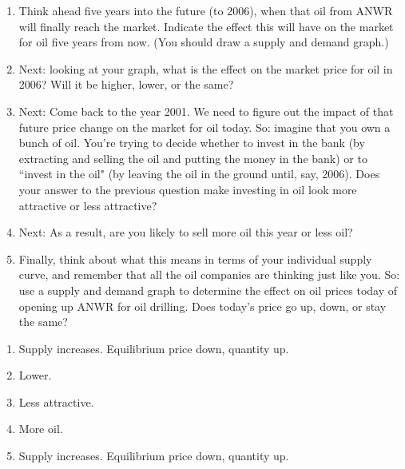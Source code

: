 \documentclass{article}
\begin{document}
\begin{enumerate}
\begin{EXAM}
    \begin{enumerate}
    \item Think ahead five years into the future (to 2006), when that oil from ANWR will finally reach the market. Indicate the effect this will have on the market for oil five years from now. (You should draw a supply and demand graph.)
    \item Next: looking at your graph, what is the effect on the market price for oil in 2006? Will it be higher, lower, or the same? %
    \item Next: Come back to the year 2001. We need to figure out the impact of that future price change on the market for oil today. So: imagine that you own a bunch of oil. You're trying to decide whether to invest in the bank (by extracting and selling the oil and putting the money in the bank) or to ``invest in the oil" (by leaving the oil in the ground until, say, 2006). Does your answer to the previous question make investing in oil look more attractive or less attractive? %
    \item Next: As a result, are you likely to sell more oil this year or less oil? %
    \item Finally, think about what this means in terms of your individual supply curve, and remember that all the oil companies are thinking just like you. So: use a supply and demand graph to determine the effect on oil prices today of opening up ANWR for oil drilling. Does today's price go up, down, or stay the same? %
    \end{enumerate}\end{EXAM}

\begin{KEY}
    \begin{enumerate}
    \item Supply increases. Equilibrium price down, quantity up.
    \item Lower.
    \item Less attractive.
    \item More oil.
    \item Supply increases. Equilibrium price down, quantity up.
    \end{enumerate}
\end{KEY}



\end{enumerate}
\end{document}
